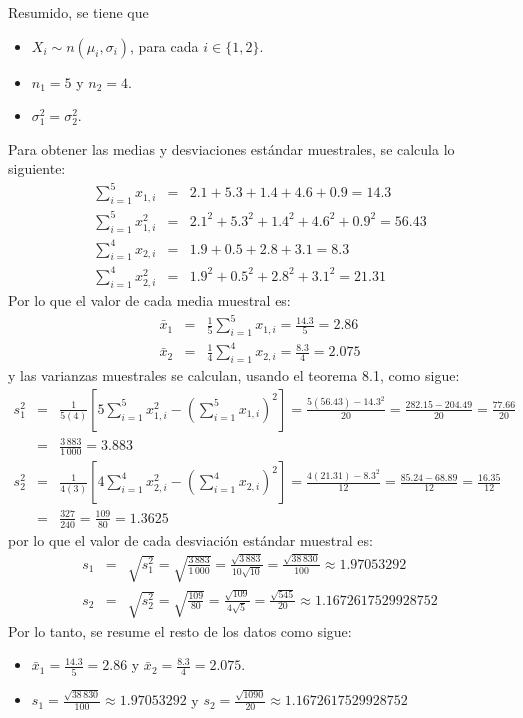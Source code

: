 \begin{solucion}
 \begin{datos}
  Resumido, se tiene que
  \begin{itemize}
   \item $X_i \sim n\left( \mu_i, \sigma_i \right)$, para cada $i \in \{ 1, 2 \}$.
   \item $n_1 = 5$ y $n_2 = 4$.
   \item $\sigma_1^2 = \sigma_2^2$.
  \end{itemize}
  Para obtener las medias y desviaciones est\'andar muestrales,
  se calcula lo siguiente:
  \begin{eqnarray*}
   \sum_{i=1}^{5} x_{1,i} & = & 2.1 + 5.3 + 1.4 + 4.6 + 0.9 = 14.3 \\
   \sum_{i=1}^{5} x_{1,i}^2 & = & 2.1^2 + 5.3^2 + 1.4^2 + 4.6^2 + 0.9^2 = 56.43 \\
   \sum_{i=1}^{4} x_{2,i} & = & 1.9 + 0.5 + 2.8 + 3.1 = 8.3 \\
   \sum_{i=1}^{4} x_{2,i}^2 & = & 1.9^2 + 0.5^2 + 2.8^2 + 3.1^2 = 21.31
  \end{eqnarray*}
  Por lo que el valor de cada media muestral es:
  \begin{eqnarray*}
   \bar{x}_1 & = & \frac{1}{5} \sum_{i=1}^5 x_{1,i} = \frac{14.3}{5} = 2.86 \\
   \bar{x}_2 & = & \frac{1}{4} \sum_{i=1}^4 x_{2,i} = \frac{8.3}{4} = 2.075
  \end{eqnarray*}
  y las varianzas muestrales se calculan, usando el teorema 8.1, como sigue:
  \begin{eqnarray*}
   s_1^2 & = & \frac{1}{5(4)}\left[ 5\sum_{i=1}^5 x_{1,i}^2 - \left( \sum_{i=1}^5 x_{1,i} \right)^2 \right] = \frac{5(56.43) - 14.3^2}{20} = \frac{282.15 - 204.49}{20} = \frac{77.66}{20} \\
   & = & \frac{3\,883}{1\,000} = 3.883 \\
   s_2^2 & = &
   \frac{1}{4(3)}\left[
   4\sum_{i=1}^4 x_{2,i}^2 - 
   \left( \sum_{i=1}^4 x_{2,i} \right)^2
   \right]
   = \frac{4(21.31) -  8.3^2}{12} = \frac{85.24 - 68.89}{12}
   = \frac{16.35}{12} \\
   & = & \frac{327}{240} = \frac{109}{80} = 1.3625
  \end{eqnarray*}
  por lo que el valor de cada desviaci\'on est\'andar muestral es:
  \begin{eqnarray*}
   s_1 & = & \sqrt{s_1^2} = \sqrt{\frac{3\,883}{1\,000}} = \frac{\sqrt{3\,883}}{10\sqrt{10}} = \frac{\sqrt{38\,830}}{100} \approx 1.97053292 \\
   s_2 & = & \sqrt{s_2^2} = \sqrt{\frac{109}{80}} = \frac{\sqrt{109}}{4\sqrt{5}} = \frac{\sqrt{545}}{20} \approx 1.1672617529928752
  \end{eqnarray*}
  Por lo tanto, se resume el resto de los datos como sigue:
  \begin{itemize}
   \item $\bar{x}_1 = \frac{14.3}{5} = 2.86$ y $\bar{x}_2 = \frac{8.3}{4} = 2.075$.
   \item $s_1 = \frac{\sqrt{38\,830}}{100} \approx 1.97053292$ y $s_2 = \frac{\sqrt{1090}}{20} \approx 1.1672617529928752$
  \end{itemize}
 \end{datos}


\end{solucion}
